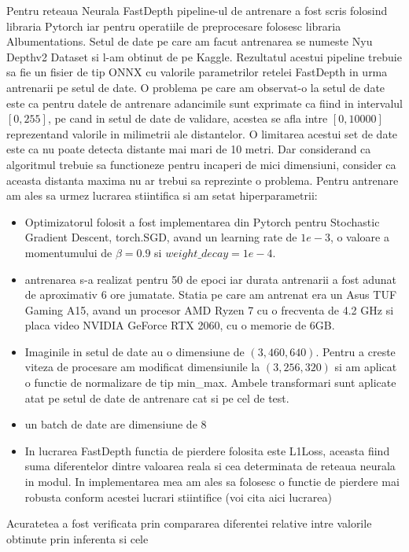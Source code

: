 \documentclass[12pt,a4paper]{report}
\begin{document}
Pentru reteaua Neurala FastDepth pipeline-ul de antrenare a fost scris folosind libraria Pytorch
iar pentru operatiile de preprocesare folosesc libraria Albumentations. Setul de date pe care 
am facut antrenarea se numeste Nyu Depthv2 Dataset si l-am obtinut de pe Kaggle. Rezultatul 
acestui pipeline trebuie sa fie un fisier de tip ONNX cu valorile parametrilor retelei FastDepth 
in urma antrenarii pe setul de date. O problema pe care am observat-o la setul de date este ca 
pentru datele de antrenare adancimile sunt exprimate ca fiind in intervalul $ [0, 255] $, pe cand in setul 
de date de validare, acestea se afla intre $ [0, 10000] $ reprezentand valorile in milimetrii ale
distantelor. O limitarea acestui set de date este ca nu poate detecta distante mai mari de 10 metri.
Dar considerand ca algoritmul trebuie sa functioneze pentru incaperi de mici dimensiuni, consider ca 
aceasta distanta maxima nu ar trebui sa reprezinte o problema. Pentru antrenare am ales sa urmez lucrarea
stiintifica si am setat hiperparametrii:
\begin{itemize}
    \item Optimizatorul folosit a fost implementarea din Pytorch pentru Stochastic Gradient Descent, 
torch.SGD, avand un learning rate de $ 1e-3 $, o valoare a momentumului de $ \beta=0.9 $ si
$ weight\_decay=1e-4 $.
    \item antrenarea s-a realizat pentru 50 de epoci iar durata antrenarii a fost adunat de aproximativ 
6 ore jumatate. Statia pe care am antrenat era un Asus TUF Gaming A15, avand un procesor AMD Ryzen 7 cu o frecventa 
de 4.2 GHz si placa video NVIDIA GeForce RTX 2060, cu o memorie de 6GB.
    \item Imaginile in setul de date au o dimensiune de $ (3, 460, 640) $. Pentru a creste viteza de procesare
am modificat dimensiunile la $ (3, 256, 320) $ si am aplicat o functie de normalizare de tip min\_max. Ambele 
transformari sunt aplicate atat pe setul de date de antrenare cat si pe cel de test.
    \item un batch de date are dimensiune de 8
    \item In lucrarea FastDepth functia de pierdere folosita este L1Loss, aceasta fiind suma diferentelor dintre valoarea 
reala si cea determinata de reteaua neurala in modul. In implementarea mea am ales sa folosesc o functie de pierdere 
mai robusta conform acestei lucrari stiintifice (voi cita aici lucrarea) 
\end{itemize}
Acuratetea a fost verificata  prin compararea diferentei relative intre valorile obtinute prin inferenta si cele 
\end{document}
